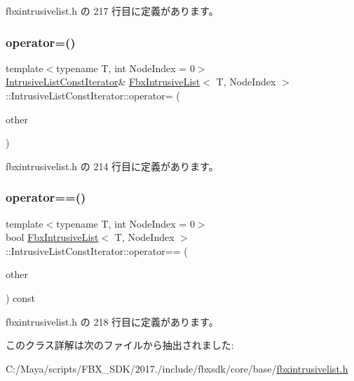  fbxintrusivelist.\+h の 217 行目に定義があります。

\mbox{\label{class_fbx_intrusive_list_1_1_intrusive_list_const_iterator_af7448cbf7d925b7fabc3271340cc3c91}} 
\subsubsection{\texorpdfstring{operator=()}{operator=()}}
{\footnotesize\ttfamily template$<$typename T, int Node\+Index = 0$>$ \\
\hyperlink{class_fbx_intrusive_list_1_1_intrusive_list_const_iterator}{Intrusive\+List\+Const\+Iterator}\& \hyperlink{class_fbx_intrusive_list}{Fbx\+Intrusive\+List}$<$ T, Node\+Index $>$\+::Intrusive\+List\+Const\+Iterator\+::operator= (\begin{DoxyParamCaption}\item[{const \hyperlink{class_fbx_intrusive_list_1_1_intrusive_list_const_iterator}{Intrusive\+List\+Const\+Iterator} \&}]{other }\end{DoxyParamCaption})\hspace{0.3cm}{\ttfamily [inline]}}



 fbxintrusivelist.\+h の 214 行目に定義があります。

\mbox{\label{class_fbx_intrusive_list_1_1_intrusive_list_const_iterator_a6ad4323602ccebcd92b8df201ccf8c0a}} 
\subsubsection{\texorpdfstring{operator==()}{operator==()}}
{\footnotesize\ttfamily template$<$typename T, int Node\+Index = 0$>$ \\
bool \hyperlink{class_fbx_intrusive_list}{Fbx\+Intrusive\+List}$<$ T, Node\+Index $>$\+::Intrusive\+List\+Const\+Iterator\+::operator== (\begin{DoxyParamCaption}\item[{const \hyperlink{class_fbx_intrusive_list_1_1_intrusive_list_const_iterator}{Intrusive\+List\+Const\+Iterator} \&}]{other }\end{DoxyParamCaption}) const\hspace{0.3cm}{\ttfamily [inline]}}



 fbxintrusivelist.\+h の 218 行目に定義があります。



このクラス詳解は次のファイルから抽出されました\+:\begin{DoxyCompactItemize}
\item 
C\+:/\+Maya/scripts/\+F\+B\+X\+\_\+\+S\+D\+K/2017./include/fbxsdk/core/base/\hyperlink{fbxintrusivelist_8h}{fbxintrusivelist.\+h}\end{DoxyCompactItemize}
